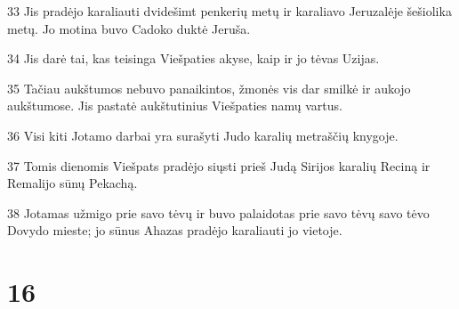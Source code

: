 \par 33 Jis pradėjo karaliauti dvidešimt penkerių metų ir karaliavo Jeruzalėje šešiolika metų. Jo motina buvo Cadoko duktė Jeruša. 
\par 34 Jis darė tai, kas teisinga Viešpaties akyse, kaip ir jo tėvas Uzijas. 
\par 35 Tačiau aukštumos nebuvo panaikintos, žmonės vis dar smilkė ir aukojo aukštumose. Jis pastatė aukštutinius Viešpaties namų vartus. 
\par 36 Visi kiti Jotamo darbai yra surašyti Judo karalių metraščių knygoje. 
\par 37 Tomis dienomis Viešpats pradėjo siųsti prieš Judą Sirijos karalių Reciną ir Remalijo sūnų Pekachą. 
\par 38 Jotamas užmigo prie savo tėvų ir buvo palaidotas prie savo tėvų savo tėvo Dovydo mieste; jo sūnus Ahazas pradėjo karaliauti jo vietoje.



\chapter{16}

